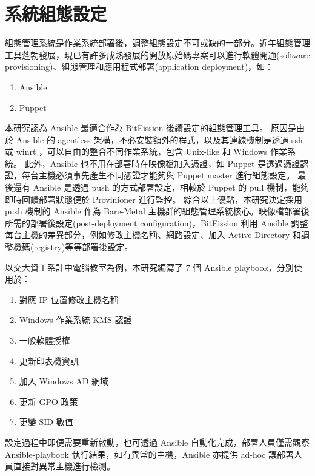 \section{系統組態設定}
組態管理系統是作業系統部署後，調整組態設定不可或缺的一部分。近年組態管理工具蓬勃發展，現已有許多成熟發展的開放原始碼專案可以進行軟體開通(software provisioning)、組態管理和應用程式部署(application deployment)，如：
\begin{enumerate}
\item Ansible\cite{ansible}
\item Puppet\cite{puppet}
\end{enumerate}
本研究認為 Ansible 最適合作為 BitFission 後續設定的組態管理工具。
原因是由於 Ansible 的 agentless 架構，不必安裝額外的程式，以及其連線機制是透過 ssh 或 winrt ，可以自由的整合不同作業系統，包含 Unix-like 和 Windows 作業系統。
此外，Ansible 也不用在部署時在映像檔加入憑證，如 Puppet 是透過憑證認證，每台主機必須事先產生不同憑證才能夠與 Puppet master 進行組態設定。
最後還有 Ansible 是透過 push 的方式部署設定，相較於 Puppet 的 pull 機制，能夠即時回饋部署狀態便於 Provinioner 進行監控。
綜合以上優點，本研究決定採用 push 機制的 Ansible 作為 Bare-Metal 主機群的組態管理系統核心。映像檔部署後所需的部署後設定(post-deployment configuration)，BitFission 利用 Ansible 調整每台主機的差異部分，例如修改主機名稱、網路設定、加入 Active Directory 和調整機碼(registry)等等部署後設定。

以交大資工系計中電腦教室為例，本研究編寫了 7 個 Ansible playbook，分別使用於：
\begin{enumerate}
\item 對應 IP 位置修改主機名稱
\item Windows 作業系統 KMS 認證
\item 一般軟體授權
\item 更新印表機資訊
\item 加入 Windows AD 網域
\item 更新 GPO 政策
\item 更變 SID 數值
\end{enumerate}
設定過程中即便需要重新啟動，也可透過 Ansible 自動化完成，部署人員僅需觀察 Ansible-playbook 執行結果，如有異常的主機，Ansible 亦提供 ad-hoc 讓部署人員直接對異常主機進行檢測。

